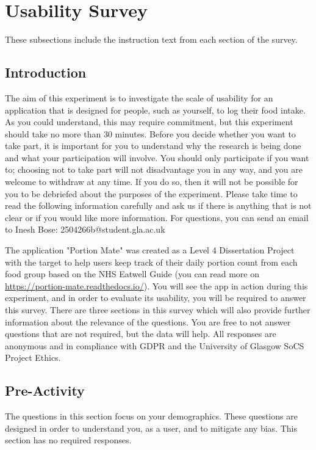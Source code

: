 \documentclass[../main.tex]{subfiles}
\begin{document}
\section{Usability Survey}

These subsections include the instruction text from each section of the survey.

\subsection{Introduction}

The aim of this experiment is to investigate the scale of usability for an application that is designed for people, such as yourself, to log their food intake. As you could understand, this may require commitment, but this experiment should take no more than 30 minutes. Before you decide whether you want to take part, it is important for you to understand why the research is being done and what your participation will involve. You should only participate if you want to; choosing not to take part will not disadvantage you in any way, and you are welcome to withdraw at any time. If you do so, then it will not be possible for you to be debriefed about the purposes of the experiment. Please take time to read the following information carefully and ask us if there is anything that is not clear or if you would like more information. For questions, you can send an email to Inesh Bose: 2504266b@student.gla.ac.uk

The application "Portion Mate" was created as a Level 4 Dissertation Project with the target to help users keep track of their daily portion count from each food group based on the NHS Eatwell Guide (you can read more on \href{https://portion-mate.readthedocs.io/}{https://portion-mate.readthedocs.io/}). You will see the app in action during this experiment, and in order to evaluate its usability, you will be required to answer this survey. There are three sections in this survey which will also provide further information about the relevance of the questions. You are free to not answer questions that are not required, but the data will help. All responses are anonymous and in compliance with GDPR and the University of Glasgow SoCS Project Ethics.

\subsection{Pre-Activity}

The questions in this section focus on your demographics. These questions are designed in order to understand you, as a user, and to mitigate any bias. This section has no required responses.
\end{document}
